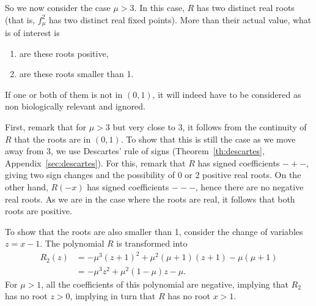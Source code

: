 \documentclass[12pt]{article}
\theoremstyle{plain}
\begin{document}
\vskip1cm
So we now consider the case $\mu>3$. In this case, $R$ has two distinct real roots (that is, $f_\mu^2$ has two distinct real fixed points). More than their actual value, what is of interest is 
\begin{enumerate}
\item are these roots positive,
\item are these roots smaller than 1.
\end{enumerate}
If one or both of them is not in $(0,1)$, it will indeed have to be considered as non biologically relevant and ignored.

First, remark that for $\mu>3$ but very close to 3, it follows from the continuity of $R$ that the roots are in $(0,1)$.
To show that this is still the case as we move away from 3, we use Descartes' rule of signs (Theorem~\ref{th:descartes}, Appendix~\ref{sec:descartes}). For this, remark that $R$ has signed coefficients $-+-$, giving two sign changes and the possibility of 0 or 2 positive real roots. On the other hand, $R(-x)$ has signed coefficients $---$, hence there are no negative real roots. As we are in the case where the roots are real, it follows that both roots are positive.

To show that the roots are also smaller than 1, consider the change of variables $z=x-1$. The polynomial $R$ is transformed into 
\begin{align*}
R_2(z) &= -\mu^3 (z+1)^2+\mu^2(\mu+1)(z+1)-\mu(\mu+1) \\
&= -\mu^3z^2+\mu^2(1-\mu)z-\mu.
\end{align*}
For $\mu>1$, all the coefficients of this polynomial are negative, implying that $R_2$ has no root $z>0$, implying in turn that $R$ has no root $x>1$.


\end{document}
